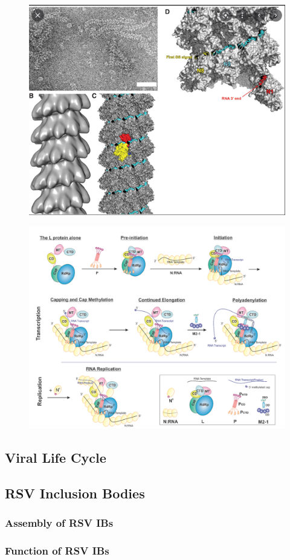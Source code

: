 \begin{figure}
    \centering
    \includegraphics[width=0.5\linewidth]{04. Introduction//Figs/08. N-structure.png}
\end{figure}

\begin{figure}
    \centering
    \includegraphics[width=0.5\linewidth]{04. Introduction//Figs/09. N_p_l_m21-interaction-overview.png}  
\end{figure}



\subsection{Viral Life Cycle} \label{subsec:Viral Life Cycle}


\subsection{RSV Inclusion Bodies} \label{subsec:RSV Inclusion Bodies}


\subsubsection{Assembly of RSV IBs} \label{Assembly of RSV IBs}


\subsubsection{Function of RSV IBs} \label{Function of RSV IBs}



